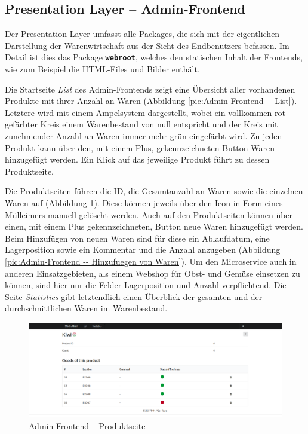 \newpage
\subsection{Presentation Layer -- Admin-Frontend}
\label{subsec: Presentation Layer}
Der Presentation Layer umfasst alle  Packages, die sich mit der eigentlichen Darstellung der Warenwirtschaft aus der Sicht des Endbenutzers befassen. Im Detail ist dies das Package \textbf{\texttt{webroot}}, welches den statischen Inhalt der Frontends, wie zum Beispiel die HTML-Files und Bilder enthält. \par 
Die Startseite \textit{List} des Admin-Frontends zeigt eine Übersicht aller vorhandenen Produkte mit ihrer Anzahl an Waren (Abbildung \ref{pic:Admin-Frontend -- List}). Letztere wird mit einem Ampelsystem dargestellt, wobei ein vollkommen rot gefärbter Kreis einem Warenbestand von null entspricht und der Kreis mit zunehmender Anzahl an Waren immer mehr grün eingefärbt wird. Zu jeden Produkt kann über den, mit einem  Plus, gekennzeichneten Button Waren hinzugefügt werden. Ein Klick auf das jeweilige Produkt führt zu dessen Produktseite. \par 
Die Produktseiten führen die ID, die Gesamtanzahl an Waren sowie die einzelnen Waren auf (Abbildung \ref{pic:Admin-Frontend -- Produktseite}). Diese können jeweils über den Icon in Form eines Mülleimers manuell gelöscht werden. Auch auf den Produktseiten können über einen, mit einem Plus gekennzeichneten, Button neue Waren hinzugefügt werden. Beim Hinzufügen von neuen Waren sind für diese ein Ablaufdatum, eine Lagerposition sowie ein Kommentar und die Anzahl anzugeben (Abbildung \ref{pic:Admin-Frontend -- Hinzufuegen von Waren}). Um den Microservice auch in anderen Einsatzgebieten, als einem Webshop für Obst- und Gemüse einsetzen zu können, sind hier nur die Felder Lagerposition und Anzahl verpflichtend.  Die Seite \textit{Statistics} gibt letztendlich einen Überblick der gesamten und der durchschnittlichen Waren im Warenbestand.

\begin{figure}[H]
	\centering
	\includegraphics[width=0.65 \textwidth]{./pics/product.png}
	\caption{Admin-Frontend -- Produktseite}
	\label{pic:Admin-Frontend -- Produktseite}
\end{figure}


